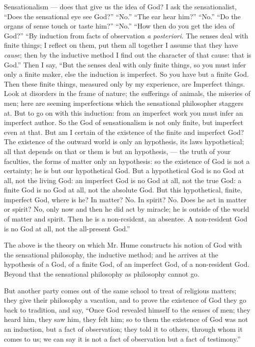 \documentclass[12pt]{article}
\begin{document}
Sensationalism --- does that give us the idea of God? 
I ask the sensationalist, ``Does the sensational eye see 
God?'' ``No.'' ``The ear hear him?'' ``No.'' ``Do 
the organs of sense touch or taste him?'' ``No.'' 
``How then do you get the idea of God?'' ``By induction from facts of observation \emph{a posteriori}. The 
senses deal with finite things; I reflect on them, put 
them all together I assume that they have \emph{cause}; then 
by the inductive method I find out the character of that 
cause: that is God.'' Then I say, ``But the senses deal 
with only finite things, so you must infer only a finite 
maker, else the induction is imperfect. So you have 
but a finite God. Then these finite things, measured 
only by my experience, are Imperfect things. Look at 
disorders in the frame of nature; the sufferings of animals, the miseries of men; here are seeming imperfections which the sensational philosopher staggers at. 
But to go on with this induction: from an imperfect 
work you must infer an imperfect author. So the God 
of sensationalism is not only finite, but imperfect even 
at that. But am I certain of the existence of the finite 
and imperfect God? The existence of the outward 
world is only an hypothesis, its laws hypothetical; all 
that depends on that or them is but an hypothesis, --- 
the truth of your faculties, the forms of matter only 
an hypothesis: so the existence of God is not a certainty; he is but our hypothetical God. But a hypothetical God is no God at all, not the living God: an 
imperfect God is no God at all, not the true God: a 
finite God is no God at all, not the absolute God. But 
this hypothetical, finite, imperfect God, where is he? 
In matter? No. In spirit? No. Does he act in 
matter or spirit? No, only now and then he did act 
by miracle; he is outside of the world of matter and spirit. Then he is a non-rcsidcnt, an absentee. A 
non-resident God is no God at all, not the all-present 
God.'' 

The above is the theory on which Mr. Hume constructs his notion of God with the sensational philosophy, the inductive method; and he arrives at the hypothesis of a God, of a finite God, of an imperfect God, 
of a non-resident God. Beyond that the sensational 
philosophy as philosophy cannot go. 

But another party comes out of the same school to 
treat of religious matters; they give their philosophy a 
vacation, and to prove the existence of God they go 
back to tradition, and say, ``Once God revealed himself 
to the senses of men; they heard him, they saw him, 
they felt him; so to them the existence of God was not 
an induction, but a fact of observation; they told it to 
others, through whom it comes to us; we can say it is 
not a fact of observation but a fact of testimony.'' 
\end{document}
